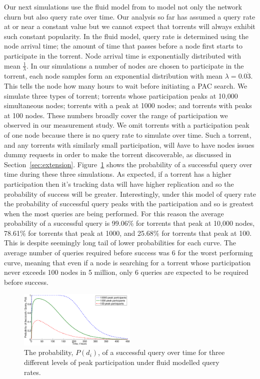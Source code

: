 Our next simulations use the fluid model from \cite{Qiu2004,Guo2007} to model not only the network churn but also query rate over time. Our analysis so far has assumed a query rate at or near a constant value but we cannot expect that torrents will always exhibit such constant popularity. In the fluid model, query rate is determined using the node arrival time; the amount of time that passes before a node first starts to participate in the torrent. Node arrival time is exponentially distributed with mean $\tfrac{1}{\lambda}$. In our simulations a number of nodes are chosen to participate in the torrent, each node samples form an exponential distribution with mean $\lambda=0.0\dot{3}$. This tells the node how many hours to wait before initiating a PAC search. We simulate three types of torrent; torrents whose participation peaks at 10,000 simultaneous nodes; torrents with a peak at 1000 nodes; and torrents with peaks at 100 nodes. These numbers broadly cover the range of participation we observed in our measurement study. We omit torrents with a participation peak of one node because there is no query rate to simulate over time. Such a torrent, and any torrents with similarly small participation, will {\emph have} to have nodes issues dummy requests in order to make the torrent discoverable, as discussed in Section~\ref{sec:extension}. Figure~\ref{fig:probability_exp_standard} shows the probability of a successful query over time during these three simulations. As expected, if a torrent has a higher participation then it's tracking data will have higher replication and so the probability of success will be greater. Interestingly, under this model of query rate the probability of successful query peaks with the participation and so is greatest when the most queries are being performed. For this reason the average probability of a successful query is 99.06\% for torrents that peak at 10,000 nodes, 78.61\% for torrents that peak at 1000, and 25.68\% for torrents that peak at 100. This is despite seemingly long tail of lower probabilities for each curve. The average number of queries required before success was 6 for the worst performing curve, meaning that even if a node is searching for a torrent whose participation never exceeds 100 nodes in 5 million, only 6 queries are expected to be required before success.

\begin{figure}[t]
    \centering
    \includegraphics[width=0.5\textwidth]{Images/ProbabilityExpStandard.eps}
    \caption{The probability, $P(d_i)$, of a successful query over time for three different levels of peak participation under fluid modelled query rates.}
    \label{fig:probability_exp_standard}
\end{figure}